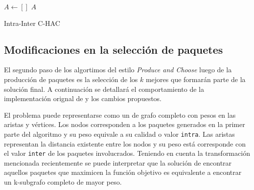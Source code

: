 \begin{center}
	\begin{algorithm}[H]
	\DontPrintSemicolon
	\SetAlgoLined
		$A \leftarrow []$\;
		\Return $A$\;
	\caption{Intra-Inter C-HAC}\label{alg:Intra-Inter C-HAC}
	\end{algorithm}
\end{center}

\subsection{Modificaciones en la selección de paquetes}
El segundo paso de los algortimos del estilo \emph{Produce and Choose} luego de la producción de paquetes es la selección de los $k$ mejores que formarán parte de la solución final. A continuación se detallará el comportamiento de la implementación orignal de \cite{journals/tkde/Amer-YahiaBCFMZ14} y los cambios propuestos.

El problema puede representarse como un de grafo completo con pesos en las aristas y vértices. Los nodos corresponden a los paquetes generados en la primer parte del algoritmo y su peso equivale a su calidad o valor \texttt{intra}. Las aristas representan la distancia existente entre los nodos y su peso está corresponde con el valor \texttt{inter} de los paquetes involucrados. Teniendo en cuenta la transformación mencionada recientemente se puede interpretar que la solución de encontrar aquellos paquetes que maximicen la función objetivo es equivalente a encontrar un k-subgrafo completo de mayor peso.

